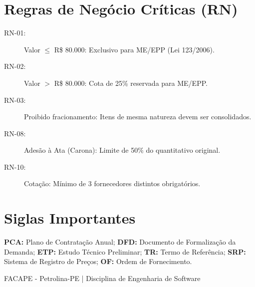 \documentclass[a4paper,11pt]{article}
\begin{document}
\section{Regras de Negócio Críticas (RN)}
\begin{description}
    \item[RN-01:] Valor $\leq$ R\$ 80.000: Exclusivo para ME/EPP (Lei 123/2006).
    \item[RN-02:] Valor $>$ R\$ 80.000: Cota de 25\% reservada para ME/EPP.
    \item[RN-03:] Proibido fracionamento: Itens de mesma natureza devem ser consolidados.
    \item[RN-08:] Adesão à Ata (Carona): Limite de 50\% do quantitativo original.
    \item[RN-10:] Cotação: Mínimo de 3 fornecedores distintos obrigatórios.
\end{description}

\section{Siglas Importantes}
\textbf{PCA:} Plano de Contratação Anual; \textbf{DFD:} Documento de Formalização da Demanda; \textbf{ETP:} Estudo Técnico Preliminar; \textbf{TR:} Termo de Referência; \textbf{SRP:} Sistema de Registro de Preços; \textbf{OF:} Ordem de Fornecimento.

\vfill
\begin{center}
    \footnotesize FACAPE - Petrolina-PE | Disciplina de Engenharia de Software
\end{center}
\end{document}
